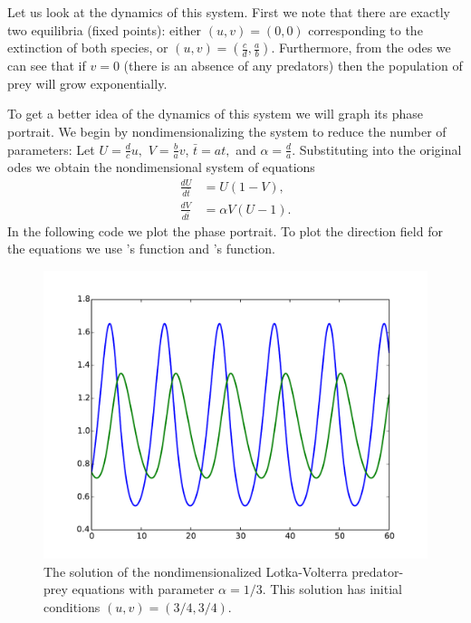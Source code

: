 Let us look at the dynamics of this system. First we note 
that there are exactly two equilibria (fixed points): either 
$(u,v) = (0,0)$ corresponding to the extinction of both 
species, or $(u,v) = (\frac{c}{d},\frac{a}{b})$.
 Furthermore, from the odes we can see that if $v=0$ (there
 is an absence of any predators) then the population of prey
 will grow exponentially.

To get a better idea of the dynamics of this system we will graph its phase portrait.
We begin by nondimensionalizing the system to reduce the number of parameters: 
Let $U = \frac{d}{c}u,$ $V = \frac{b}{a}v$, $\bar{t} = at,$ and  
$\alpha = \frac{d}{a}$. Substituting into the original odes we 
obtain the nondimensional system of equations
\begin{align*}
	\frac{dU}{d\bar{t}} &= U(1-V),\\
	\frac{dV}{d\bar{t}} &= \alpha V (U-1).
\end{align*}
In the following code we plot the phase portrait. To plot the direction field 
for the equations we use 's  function and 
's  function.


\begin{figure}[ht]
\centering
\includegraphics[width=\textwidth]{Lotka_Volterra.pdf}
\caption{The solution of the nondimensionalized Lotka-Volterra 
predator-prey equations with parameter $\alpha = 1/3$. 
This solution has initial conditions $(u,v) = (3/4, 3/4)$. }
\label{pred-prey:Lotka_Voterra}
\end{figure}


